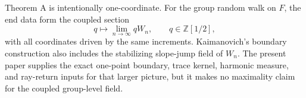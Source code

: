 \documentclass[11pt,a4paper]{scrartcl}
\begin{document}
\begin{remark}\label{rem:group-level-interface}
Theorem A is intentionally one-coordinate.  For the group random
walk on \(F\), the end data form the coupled section
\[
q\longmapsto \lim_{n\to\infty} qW_n,
\qquad q\in\mathbb Z[1/2],
\]
with all coordinates driven by the same increments.  Kaimanovich's boundary
construction also includes the stabilizing slope-jump field of \(W_n\).  The
present paper supplies the exact one-point boundary, trace kernel, harmonic
measure, and ray-return inputs for that larger picture, but it makes no
maximality claim for the coupled group-level field.
\end{remark}

\nocite{CartwrightSoardiWoess1993}
\printbibliography
\end{document}
